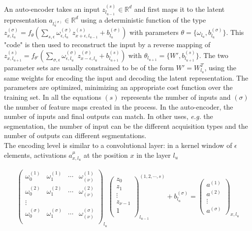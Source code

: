 \documentclass[final, paper=letter,5p,times,twocolumn]{elsarticle}
\begin{document}
An auto-encoder takes an input $z_{l_{u-1}}^{(s)} \in \mathbb{R}^{d}$ and first maps it to the latent representation $a_{l_{u}^{(\sigma)}} \in \mathbb{R}^{d}$ using a deterministic function of the type $z_{x,l_{u}}^{(\sigma)} = f_{\theta}(\sum_{s,\epsilon} \omega_{\epsilon,l_{u}}^{(\sigma)}z_{x+\epsilon,l_{u-1}}^{(s)} + b_{l_{u}}^{(\sigma)})$ with parameters $\theta = \{\omega_{l_{u}}, b_{l_{u}}^{(\sigma)}\}$. This "code" is then used to reconstruct the input by a reverse mapping of $z_{x,l_{u+1}}^{(s)} = f_{\theta'}(\sum_{\sigma,\epsilon} \omega_{\epsilon,l_{u}}^{(\sigma)}z_{x-\epsilon,l_{u}}^{(\sigma)} + b_{l_{u+1}}^{(s)})$ with $\theta_{l_{u+1}} = \{W', b_{l_{u+1}}^{(s)}\}$. The two parameter sets are usually constrained to be of the form $W' = W_{l_{u}}^{T}$, using the same weights for encoding the input and decoding the latent representation. The parameters are optimized, minimizing an appropriate cost function over the training set. In all the equations $(s)$ represents the number of inputs and $(\sigma)$ the number of feature maps created in the process. In the auto-encoder, the number of inputs and final outputs can match. In other uses, {\it e.g.} the segmentation, the number of input can be the different acquisition types and the number of outputs can different segmentations.\\
The encoding level is similar to a convolutional layer: in a kernel window of $\epsilon$ elements, activations $a_{x,l_{u}}^{\mu}$ at the position $x$ in the layer $l_{u}$ 

\begin{eqnarray*}
  \left(
  \begin{array}{cccc}
    \omega_{0}^{(1)} & \omega_{1}^{(1)} & \cdots & \omega_{(\nu)}^{(1)} \\
    \omega_{0}^{(2)} & \omega_{1}^{(2)} & \cdots & \omega_{(\nu)}^{(2)} \\
    \vdots \\
    \omega_{0}^{(\sigma)} & \omega_{1}^{(\sigma)} & \cdots & \omega_{(\nu)}^{(\sigma)} \\
  \end{array}
  \right)_{l_{u}} \left(
  \begin{array}{c}
    z_{0} \\
    z_{1} \\
    \vdots \\
    z_{\nu-1} \\
    1 \\
  \end{array}
  \right)_{l_{u-1}}^{(1,2,\cdots,s)} + b_{l_{u}}^{(\sigma)}= \left(
  \begin{array}{c}
    a^{(1)} \\
    a^{(2)} \\
    \vdots \\
    a^{(\sigma)} 
  \end{array}
  \right)_{x,l_{u}}
\end{eqnarray*}
\end{document}
